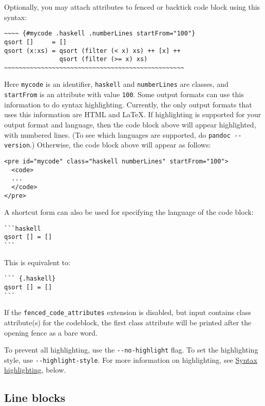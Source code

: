 \documentclass[]{article}
\begin{document}
Optionally, you may attach attributes to fenced or backtick code block
using this syntax:

\begin{verbatim}
~~~~ {#mycode .haskell .numberLines startFrom="100"}
qsort []     = []
qsort (x:xs) = qsort (filter (< x) xs) ++ [x] ++
               qsort (filter (>= x) xs)
~~~~~~~~~~~~~~~~~~~~~~~~~~~~~~~~~~~~~~~~~~~~~~~~~
\end{verbatim}

Here \texttt{mycode} is an identifier, \texttt{haskell} and
\texttt{numberLines} are classes, and \texttt{startFrom} is an attribute
with value \texttt{100}. Some output formats can use this information to
do syntax highlighting. Currently, the only output formats that uses
this information are HTML and LaTeX. If highlighting is supported for
your output format and language, then the code block above will appear
highlighted, with numbered lines. (To see which languages are supported,
do \texttt{pandoc\ -\/-version}.) Otherwise, the code block above will
appear as follows:

\begin{verbatim}
<pre id="mycode" class="haskell numberLines" startFrom="100">
  <code>
  ...
  </code>
</pre>
\end{verbatim}

A shortcut form can also be used for specifying the language of the code
block:

\begin{verbatim}
```haskell
qsort [] = []
```
\end{verbatim}

This is equivalent to:

\begin{verbatim}
``` {.haskell}
qsort [] = []
```
\end{verbatim}

If the \texttt{fenced\_code\_attributes} extension is disabled, but
input contains class attribute(s) for the codeblock, the first class
attribute will be printed after the opening fence as a bare word.

To prevent all highlighting, use the \texttt{-\/-no-highlight} flag. To
set the highlighting style, use \texttt{-\/-highlight-style}. For more
information on highlighting, see
\protect\hyperlink{syntax-highlighting}{Syntax highlighting}, below.

\subsection{Line blocks}\label{line-blocks}
\end{document}
